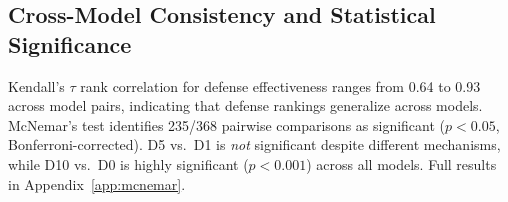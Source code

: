 \subsection{Cross-Model Consistency and Statistical Significance}

Kendall's $\tau$ rank correlation for defense effectiveness ranges from 0.64 to 0.93 across model pairs, indicating that defense rankings generalize across models.
McNemar's test identifies 235/368 pairwise comparisons as significant ($p < 0.05$, Bonferroni-corrected).
D5 vs.\ D1 is \emph{not} significant despite different mechanisms, while D10 vs.\ D0 is highly significant ($p < 0.001$) across all models.
Full results in Appendix~\ref{app:mcnemar}.
